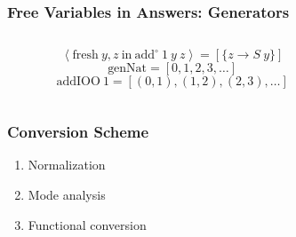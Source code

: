 \documentclass[xcolor=table, aspectratio=169]{beamer}
\begin{document}
\begin{frame}[fragile]
  \frametitle{Free Variables in Answers: Generators}
\begin{columns}
  \begin{column}[t]{0.49\textwidth}
    
    \[ \left<\text{fresh}\ y,z\ \text{in}\ \text{add}^{\circ}\ 1\ y\ z\right> = \left[\{z \to S\ y\}\right]\]
    \[ \text{genNat} = \left[0, 1, 2, 3, \ldots\right] \] 
    \[ \text{addIOO}\ 1 = \left[(0, 1), (1, 2), (2, 3), \ldots\right] \] 
  \end{column}
  \begin{column}[t]{0.49\textwidth}
    
  \end{column}
\end{columns}
\end{frame}




\lstset{basicstyle=\small}

%     
%     

\begin{frame}[fragile]
  \frametitle{Conversion Scheme}
  \begin{center}
    \begin{minipage}{0.4\textwidth}
      \begin{enumerate}
          \item Normalization
          \item Mode analysis
          \item Functional conversion
      \end{enumerate}
    \end{minipage}
  \end{center}
\end{frame}
\end{document}
